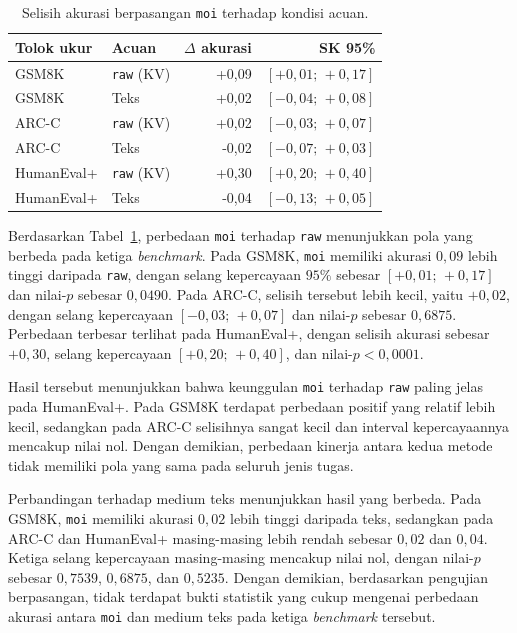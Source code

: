 \begin{table}[H]
    \centering
    \caption{Selisih akurasi berpasangan \texttt{moi} terhadap kondisi acuan.}
    \label{tab:selisih-moi-acuan}
    \small
    \begin{tabular}{llrr}
        \hline
        Tolok ukur & Acuan & $\Delta$ akurasi & SK 95\% \\
        \hline
        GSM8K & \texttt{raw} (KV)
        & +0,09 & $[+0,01;\,+0,17]$ \\
        GSM8K & Teks
        & +0,02 & $[-0,04;\,+0,08]$ \\
        \hline
        ARC-C & \texttt{raw} (KV)
        & +0,02 & $[-0,03;\,+0,07]$ \\
        ARC-C & Teks
        & -0,02 & $[-0,07;\,+0,03]$ \\
        \hline
        HumanEval+ & \texttt{raw} (KV)
        & +0,30 & $[+0,20;\,+0,40]$ \\
        HumanEval+ & Teks
        & -0,04 & $[-0,13;\,+0,05]$ \\
        \hline
    \end{tabular}
\end{table}

Berdasarkan Tabel~\ref{tab:selisih-moi-acuan}, perbedaan \texttt{moi} terhadap
\texttt{raw} menunjukkan pola yang berbeda pada ketiga \textit{benchmark}.
Pada GSM8K, \texttt{moi} memiliki akurasi $0{,}09$ lebih tinggi daripada
\texttt{raw}, dengan selang kepercayaan $95\%$ sebesar
$[+0{,}01;\,+0{,}17]$ dan nilai-$p$ sebesar $0{,}0490$. Pada ARC-C, selisih
tersebut lebih kecil, yaitu $+0{,}02$, dengan selang kepercayaan
$[-0{,}03;\,+0{,}07]$ dan nilai-$p$ sebesar $0{,}6875$. Perbedaan terbesar
terlihat pada HumanEval+, dengan selisih akurasi sebesar $+0{,}30$,
selang kepercayaan $[+0{,}20;\,+0{,}40]$, dan nilai-$p<0{,}0001$.

Hasil tersebut menunjukkan bahwa keunggulan \texttt{moi} terhadap
\texttt{raw} paling jelas pada HumanEval+. Pada GSM8K terdapat perbedaan
positif yang relatif lebih kecil, sedangkan pada ARC-C selisihnya sangat
kecil dan interval kepercayaannya mencakup nilai nol. Dengan demikian,
perbedaan kinerja antara kedua metode tidak memiliki pola yang sama pada
seluruh jenis tugas.

Perbandingan terhadap medium teks menunjukkan hasil yang berbeda. Pada
GSM8K, \texttt{moi} memiliki akurasi $0{,}02$ lebih tinggi daripada teks,
sedangkan pada ARC-C dan HumanEval+ masing-masing lebih rendah sebesar
$0{,}02$ dan $0{,}04$. Ketiga selang kepercayaan masing-masing mencakup nilai
nol, dengan nilai-$p$ sebesar $0{,}7539$, $0{,}6875$, dan $0{,}5235$.
Dengan demikian, berdasarkan pengujian berpasangan, tidak terdapat bukti
statistik yang cukup mengenai perbedaan akurasi antara \texttt{moi} dan
medium teks pada ketiga \textit{benchmark} tersebut.

